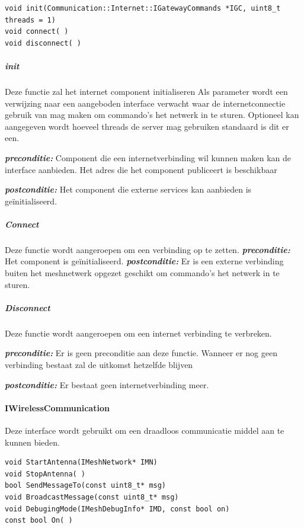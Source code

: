 \documentclass[a4paper, 11pt, oneside]{report}
\begin{document}
\begin{lstlisting}
void init(Communication::Internet::IGatewayCommands *IGC, uint8_t threads = 1)
void connect( )
void disconnect( )
\end{lstlisting}


\subparagraph{init}
\label{DetailedDesign:ros:extern:interfaces:IInternetConnection:Init}
Deze functie zal het internet component initialiseren
Als parameter wordt een verwijzing naar een aangeboden interface verwacht waar de internetconnectie gebruik van mag maken om commando's het netwerk in te sturen. Optioneel kan aangegeven wordt hoeveel threads de server mag gebruiken standaard is dit er een.


\textbf{\textit{preconditie:}} Component die een internetverbinding wil kunnen maken kan de interface  aanbieden. Het adres die het component publiceert is beschikbaar

\textbf{\textit{postconditie:}} Het component die externe services kan aanbieden is geïnitialiseerd. 




\subparagraph{Connect} 
\label{DetailedDesign:ros:extern:interfaces:IInternetConnection:Connect}
Deze functie wordt aangeroepen om een verbinding op te zetten.
\textbf{\textit{preconditie:}} Het component is geïnitialiseerd. 
\textbf{\textit{postconditie:}} Er is een externe verbinding buiten het meshnetwerk opgezet geschikt om commando's het netwerk in te sturen.

\subparagraph{Disconnect} 
\label{DetailedDesign:ros:extern:interfaces:IInternetConnection:Disconnect}
Deze functie wordt aangeroepen om een internet verbinding te verbreken.

\textbf{\textit{preconditie:}} Er is geen preconditie aan deze functie. 
Wanneer er nog geen verbinding bestaat zal de uitkomst hetzelfde blijven

\textbf{\textit{postconditie:}} Er bestaat geen internetverbinding meer. 

\paragraph{IWirelessCommunication}
\label{DetailedDesign:ros:extern:interfaces:IWirelessCommunication}
Deze interface wordt gebruikt om een draadloos communicatie middel aan te kunnen bieden.

\begin{lstlisting}
void StartAntenna(IMeshNetwork* IMN)
void StopAntenna( )
bool SendMessageTo(const uint8_t* msg)
void BroadcastMessage(const uint8_t* msg)
void DebugingMode(IMeshDebugInfo* IMD, const bool on)
const bool On( )
\end{lstlisting}
\end{document}
